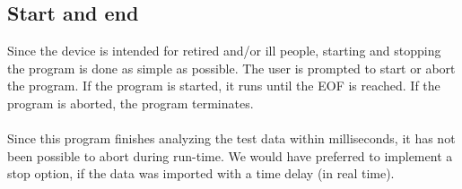 \subsection{Start and end}
Since the device is intended for retired and/or ill people, starting and stopping the program is done as simple as possible. The user is prompted to start or abort the program. If the program is started, it runs until the EOF is reached. If the program is aborted, the program terminates.\\
\\
Since this program finishes analyzing the test data within milliseconds, it has not been possible to abort during run-time. We would have preferred to implement a stop option, if the data was imported with a time delay (in real time). 